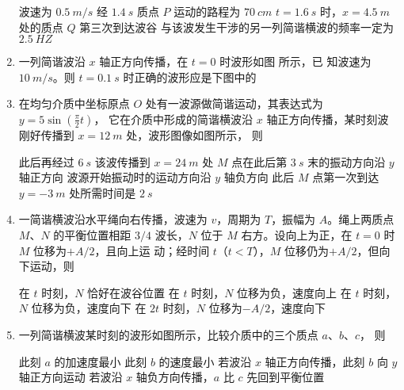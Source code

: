 \begin{enumerate}
\fourchoices
{波速为 $ 0.5 \ m /s $}
{经 $ 1.4 \ s $ 质点 $ P $ 运动的路程为 $ 70 \ cm $}
{$ t=1.6 \ s $ 时，$ x=4.5 \ m $ 处的质点 $ Q $ 第三次到达波谷}
{与该波发生干涉的另一列简谐横波的频率一定为 $ 2.5 \ HZ $}


\item 
{}
一列简谐波沿 $ x $ 轴正方向传播，在 $ t=0 $ 时波形如图 所示，已
知波速为 $ 10 \ m /s $。则 $ t=0.1 \ s $ 时正确的波形应是下图中的  
\begin{figure}[h!]
	\centering
	
\end{figure}


\pfourchoices
{}
{}
{}
{}


\item 
{}
在均匀介质中坐标原点 $ O $ 处有一波源做简谐运动，其表达式为 $y=5 \sin \left(\frac{\pi}{2} t\right)$，
它在介质中形成的简谐横波沿 $ x $ 轴正方向传播，某时刻波刚好传播到 $ x=12 \ m $ 处，波形图像如图所示，
则  
\begin{figure}[h!]
	\centering
	
\end{figure}

\fourchoices
{此后再经过 $ 6 \ s $ 该波传播到 $ x=24 \ m $ 处}
{$ M $ 点在此后第 $ 3 \ s $ 末的振动方向沿 $ y $ 轴正方向}
{波源开始振动时的运动方向沿 $ y $ 轴负方向}
{此后 $ M $ 点第一次到达 $ y=-3 \ m $ 处所需时间是 $ 2 \ s $}


\item 
{}
一简谐横波沿水平绳向右传播，波速为 $ v $，周期为 $ T $，振幅为 $ A $。绳上两质点
$ M $、$ N $ 的平衡位置相距 $ 3/4 $ 波长，$ N $ 位于 $ M $ 右方。设向上为正，在 $ t=0 $ 时 $ M $ 位移为$ +A/2 $，且向上运
动；经时间 $ t $（$ t<T $），$ M $ 位移仍为$ +A/2 $，但向下运动，则  


\fourchoices
{在 $ t $ 时刻，$ N $ 恰好在波谷位置}
{在 $ t $ 时刻，$ N $ 位移为负，速度向上}
{在 $ t $ 时刻，$ N $ 位移为负，速度向下}
{在 $ 2t $ 时刻，$ N $ 位移为$ -A/2 $，速度向下}


\item 
{}
一列简谐横波某时刻的波形如图所示，比较介质中的三个质点 $ a $、$ b $、$ c $，
则  
\begin{figure}[h!]
	\centering
	
\end{figure}


\fourchoices
{此刻 $ a $ 的加速度最小}
{此刻 $ b $ 的速度最小}
{若波沿 $ x $ 轴正方向传播，此刻 $ b $ 向 $ y $ 轴正方向运动}
{若波沿 $ x $ 轴负方向传播，$ a $ 比 $ c $ 先回到平衡位置}






	
	
	
\end{enumerate}

